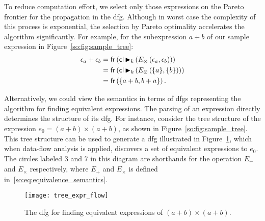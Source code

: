 To reduce computation effort, we select only those expressions on the Pareto
frontier for the propagation in the \gls{dfg}\@. Although in worst case the
complexity of this process is exponential, the selection by Pareto optimality
accelerates the algorithm significantly. For example, for the subexpression $a
+ b$ of our sample expression in Figure~\ref{so:fig:sample_tree}:
\begin{equation}
    \begin{aligned}
        \epsilon_a + \epsilon_b
            &= \operatorname{\mathsf{fr}}\left(
                    \operatorname{\mathsf{cl}} \operatorname{\blacktriangleright}_k \left(
                        E_\otimes \left( \epsilon_a, \epsilon_b \right)
                    \right)
                \right) \\
            &= \operatorname{\mathsf{fr}}\left(
                    \operatorname{\mathsf{cl}} \operatorname{\blacktriangleright}_k \left(
                        E_\otimes \left( \{a\}, \{b\} \right)
                    \right)
                \right) \\
            &= \operatorname{\mathsf{fr}}\left(
                    \{ a + b, b + a \}
                \right).
    \end{aligned}
\end{equation}

Alternatively, we could view the semantics in terms of \glspl{dfg} representing
the algorithm for finding equivalent expressions. The parsing of an expression
directly determines the structure of its \gls{dfg}\@. For instance, consider
the tree structure of the expression $e_0 = (a + b) \times (a + b)$, as shown
in Figure~\ref{so:fig:sample_tree}. This tree structure can be used to generate
a \gls{dfg} illustrated in Figure~\ref{so:fig:tree_expr_flow}, which when
data-flow analysis is applied, discovers a set of equivalent expressions to
$e_0$. The circles labeled $3$ and $7$ in this diagram are shorthands for the
operation $E_+$ and $E_\times$ respectively, where $E_+$ and $E_\times$ is
defined in~\eqref{so:eq:equivalence_semantics}.
\begin{figure}[ht]
    \centering
    \texttt{[image: tree\_expr\_flow]}
    \caption{%
        The \acrshort{dfg} for finding equivalent expressions of
        $(a + b) \times (a + b)$.
    }\label{so:fig:tree_expr_flow}
\end{figure}

